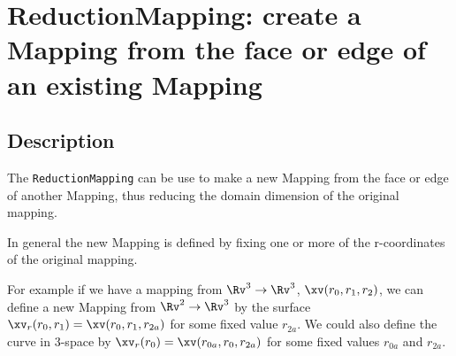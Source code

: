 \section{ReductionMapping: create a Mapping from the face or edge of an existing Mapping}

\subsection{Description}

  The {\tt ReductionMapping} can be use to make a new Mapping from the face or edge of
another Mapping, thus reducing the domain dimension of the original mapping. 

In general the new Mapping is defined by fixing one or more of the r-coordinates
of the original mapping. 

For example if we have a mapping from $\Rv^3\rightarrow \Rv^3$, $\xv(r_0,r_1,r_2)$,
we can define a new Mapping from $\Rv^2\rightarrow \Rv^3$ by the surface
$\xv_r(r_0,r_1)=\xv(r_0,r_1,r_{2a})$ for some fixed value $r_{2a}$. 
We could also define the curve in 3-space by
$\xv_r(r_0)=\xv(r_{0a},r_0,r_{2a})$ for some fixed values $r_{0a}$ and $r_{2a}$. 



